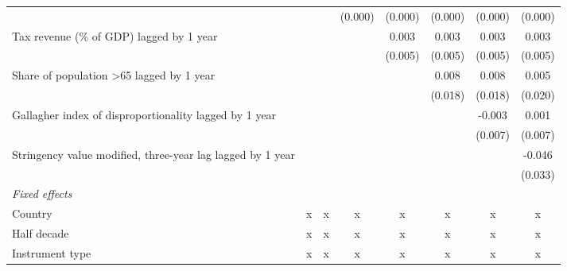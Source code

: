 \begin{tabular}{lccccccc}
                                                                           &         &               & (0.000)       & (0.000)       & (0.000)       & (0.000)       & (0.000)\\   
   Tax revenue (\% of GDP) lagged by 1 year                                &         &               &               & 0.003         & 0.003         & 0.003         & 0.003\\   
                                                                           &         &               &               & (0.005)       & (0.005)       & (0.005)       & (0.005)\\   
   Share of population >65 lagged by 1 year                                &         &               &               &               & 0.008         & 0.008         & 0.005\\   
                                                                           &         &               &               &               & (0.018)       & (0.018)       & (0.020)\\   
   Gallagher index of disproportionality lagged by 1 year                  &         &               &               &               &               & -0.003        & 0.001\\   
                                                                           &         &               &               &               &               & (0.007)       & (0.007)\\   
   Stringency value modified, three-year lag lagged by 1 year              &         &               &               &               &               &               & -0.046\\   
                                                                           &         &               &               &               &               &               & (0.033)\\   
   \emph{Fixed effects}\\
   Country                                                                 & x       & x             & x             & x             & x             & x             & x\\  
   Half decade                                                             & x       & x             & x             & x             & x             & x             & x\\  
   Instrument type                                                         & x       & x             & x             & x             & x             & x             & x\\  

\end{tabular}
